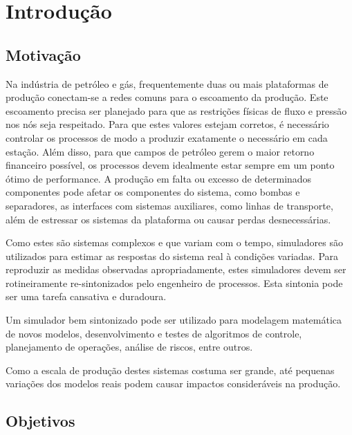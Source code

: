 

\chapter{Introdução} \label{chap:1}



\section{Motivação}
Na indústria de petróleo e gás, frequentemente duas ou mais plataformas de produção conectam-se a redes comuns para o escoamento da produção. 
%
Este escoamento precisa ser planejado para que as restrições físicas de fluxo e pressão nos nós seja respeitado.
%
Para que estes valores estejam corretos, é necessário controlar os processos de modo a produzir exatamente o necessário em cada estação.
%
Além disso, para que campos de petróleo gerem o maior retorno financeiro possível, os processos devem idealmente estar sempre em um ponto ótimo de performance.
%
A produção em falta ou excesso de determinados componentes pode afetar os componentes do sistema, como bombas e separadores, as interfaces com sistemas auxiliares, como linhas de transporte, além de estressar os sistemas da plataforma ou causar perdas desnecessárias.

Como estes são sistemas complexos e que variam com o tempo, simuladores são utilizados para estimar as respostas do sistema real à condições variadas. 
%
Para reproduzir as medidas observadas apropriadamente, estes simuladores devem ser rotineiramente re-sintonizados pelo engenheiro de processos. 
%
Esta sintonia pode ser uma tarefa cansativa e duradoura.
  
Um simulador bem sintonizado pode ser utilizado para modelagem matemática de novos modelos, desenvolvimento e testes de algoritmos de controle, planejamento de operações, análise de riscos, entre outros.	

Como a escala de produção destes sistemas costuma ser grande, até pequenas variações dos modelos reais podem causar impactos consideráveis na produção.


\section{Objetivos}

